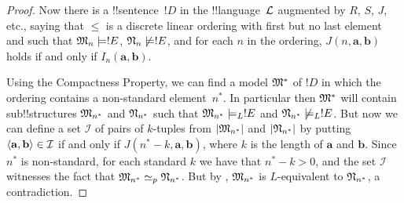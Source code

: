 \documentclass[../../../include/open-logic-section]{subfiles}
\begin{document}
\begin{proof}
Now there is a !!{sentence}~$!D$ in the !!{language}~$\mathcal L$ augmented
by $R$, $S$, $J$, etc., saying that $\le$ is a discrete linear ordering
with first but no last element and such that $\mathfrak M_n \models
!E$, $\mathfrak N_n \not\models !E$, and for each $n$ in the
ordering, $J(n, \mathbf{a}, \mathbf{b})$ holds if and only if
$I_n(\mathbf{a}, \mathbf{b})$.

Using the Compactness Property, we can find a model $\mathfrak M^*$ of
$!D$ in which the ordering contains a non-standard element~$n^*$. In
particular then $\mathfrak M^*$ will contain sub!!{structure}s
$\mathfrak M_{n^*}$ and $\mathfrak N_{n^*}$ such that $\mathfrak M_{n^*}
\models_L !E$ and $\mathfrak N_{n^*} \not\models_L !E$. But now we can
define a set $\mathcal{I}$ of pairs of $k$-tuples from
$\left| \mathfrak M_{n^*} \right|$ and $\left| \mathfrak N_{n^*} \right|$ by putting
$\langle \mathbf{a}, \mathbf{b} \rangle \in \mathcal{I}$ if and only if
$J(n^*-k, \mathbf{a}, \mathbf{b})$, where $k$ is the length of
$\mathbf{a}$ and $\mathbf{b}$. Since $n^*$ is non-standard, for each
standard $k$ we have that $n^* - k >0$, and the set $\mathcal{I}$
witnesses the fact that $\mathfrak M_{n^*} \simeq_p
\mathfrak N_{n^*}$. But by ,
$\mathfrak M_{n^*}$ is $L$-equivalent to $\mathfrak N_{n^*}$, a
contradiction.
\end{proof}
\end{document}
